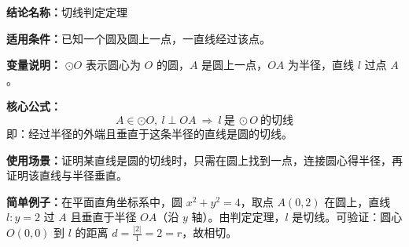 \textbf{结论名称：}切线判定定理

\textbf{适用条件：}已知一个圆及圆上一点，一直线经过该点。

\textbf{变量说明：} $\odot O$ 表示圆心为 $O$ 的圆，$A$ 是圆上一点，$OA$ 为半径，直线 $l$ 过点 $A$。

\textbf{核心公式：}
\[
\boxed{\,A\in\odot O,\ l\perp OA\ \Longrightarrow\ l\ \text{是}\ \odot O\ \text{的切线}\,}
\]
即：经过半径的外端且垂直于这条半径的直线是圆的切线。

\textbf{使用场景：}证明某直线是圆的切线时，只需在圆上找到一点，连接圆心得半径，再证明该直线与半径垂直。

\textbf{简单例子：}在平面直角坐标系中，圆 $x^{2}+y^{2}=4$，取点 $A(0,2)$ 在圆上，直线 $l:y=2$ 过 $A$ 且垂直于半径 $OA$（沿 $y$ 轴）。由判定定理，$l$ 是切线。可验证：圆心 $O(0,0)$ 到 $l$ 的距离 $d=\frac{|2|}{1}=2=r$，故相切。